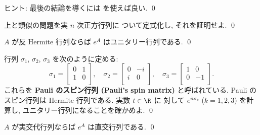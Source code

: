 \documentclass[12pt,twoside]{jarticle}
\begin{document}
\noindent
ヒント: 最後の結論を導くには  を使えば良い.
\qed


\begin{question}[12点]
  上と類似の問題を実 $n$ 次正方行列に
  ついて定式化し, それを証明せよ.
  \qed
\end{question}


\begin{question}[5点]
  $A$ が反 Hermite 行列ならば $e^A$ はユニタリー行列である.
  \qed
\end{question}


\begin{question}
\label{q:Pauli-spin-matrices}
  行列 $\sigma_1$, $\sigma_2$, $\sigma_3$ を次のように定める:
  \begin{equation*}
    \sigma_1=
    \begin{bmatrix}
      0 & 1 \\
      1 & 0 \\
    \end{bmatrix},
    \quad
    \sigma_2=
    \begin{bmatrix}
      0 & -i \\
      i & 0 \\
    \end{bmatrix},
    \quad
    \sigma_3=
    \begin{bmatrix}
      1 & 0 \\
      0 & -1 \\
    \end{bmatrix}.
  \end{equation*}
  これらを {\bf Pauli のスピン行列 (Pauli's spin matrix)} と呼ばれている. 
  Pauli のスピン行列は Hermite 行列である.  実数 $t\in\R$ に
  対して $e^{it\sigma_k}$ ($k=1,2,3$) を計算し, 
  ユニタリー行列になることを確かめよ. 
  \qed
\end{question}


\begin{question}[5点]
  $A$ が実交代行列ならば $e^A$ は直交行列である.
  \qed
\end{question}

\end{document}
